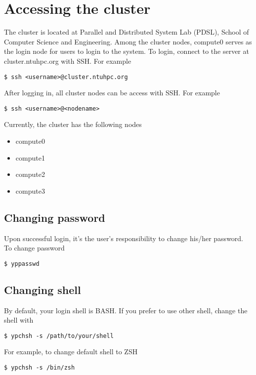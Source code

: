 \section{Accessing the cluster}

The cluster is located at Parallel and Distributed System Lab (PDSL), School of Computer Science and Engineering. Among the cluster nodes, compute0 serves as the login node for users to login to the system. To login, connect to the server at cluster.ntuhpc.org with SSH. For example

\begin{lstlisting}
$ ssh <username>@cluster.ntuhpc.org
\end{lstlisting}

\noindent After logging in, all cluster nodes can be access with SSH. For example

\begin{lstlisting}
$ ssh <username>@<nodename>
\end{lstlisting}

\noindent Currently, the cluster has the following nodes

\begin{itemize}
    \item compute0
    \item compute1
    \item compute2
    \item compute3
\end{itemize}

\subsection{Changing password}

Upon successful login, it's the user's responsibility to change his/her password. To change password

\begin{lstlisting}
$ yppasswd
\end{lstlisting}

\subsection{Changing shell}

By default, your login shell is BASH. If you prefer to use other shell, change the shell with

\begin{lstlisting}
$ ypchsh -s /path/to/your/shell
\end{lstlisting}

\noindent For example, to change default shell to ZSH

\begin{lstlisting}
$ ypchsh -s /bin/zsh
\end{lstlisting}